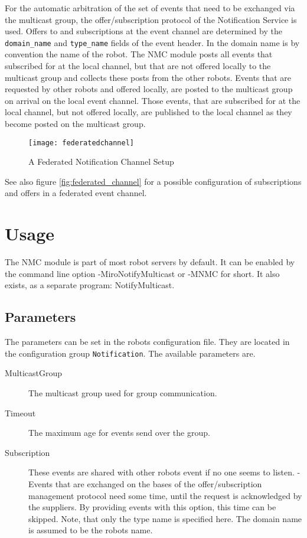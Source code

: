 For the automatic arbitration of the set of events that need to be
exchanged via the multicast group, the offer/subscription protocol of
the Notification Service is used. Offers to and subscriptions at the
event channel are determined by the \texttt{domain\_name} and
\texttt{type\_name} fields of the event header. In \miro the domain
name is by convention the name of the robot. The NMC module
posts all events that subscribed for at the local channel, but that
are not offered locally to the multicast group and collects these
posts from the other robots. Events that are requested by other
robots and offered locally, are posted to the multicast group on arrival
on the local event channel. Those events, that are subscribed for at
the local channel, but not offered locally, are published to the local
channel as they become posted on the multicast group.

\begin{figure}
\begin{center}
\texttt{[image: federatedchannel]}
\caption{\label{fig::federated_channel} 
A Federated Notification Channel Setup}
\end{center}
\end{figure}

See also figure \ref{fig:federated_channel} for a possible
configuration of subscriptions and offers in a federated event channel.

\section{Usage}

The NMC module is part of most robot servers by default. It can be
enabled by the command line option -MiroNotifyMulticast or -MNMC for
short. It also exists, as a separate program: NotifyMulticast. 

\subsection{Parameters}

The parameters can be set in the robots configuration file. They are
located in the configuration group \texttt{Notification}. The
available parameters are.
\begin{description}
\item[MulticastGroup] The multicast group used for group communication.
\item[Timeout] The maximum age for events send over the group.
\item[Subscription] These events are shared with other robots event if
  no one seems to listen. - Events that are exchanged on the bases of the
  offer/subscription management protocol need some time, until the
  request is acknowledged by the suppliers. By providing events with
  this option, this time can be skipped. Note, that only the type name
  is specified here. The domain name is assumed to be the robots name.
\end{description}


